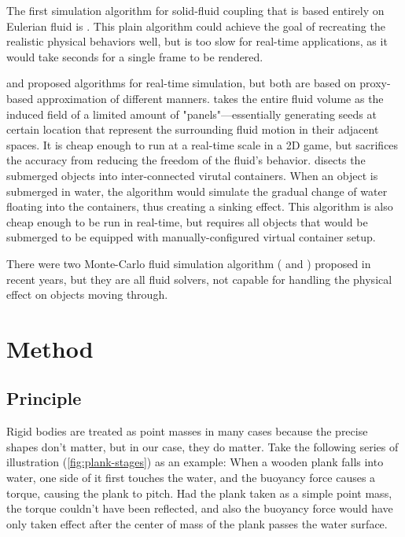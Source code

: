 \documentclass{article}
\begin{document}
The first simulation algorithm for solid-fluid coupling that is based entirely on Eulerian fluid is \cite{teng2016eulerian}.
This plain algorithm could achieve the goal of recreating the realistic physical behaviors well, but is too slow for real-time applications, as it would take seconds for a single frame to be rendered.

\cite{GER13} and \cite{BAJ20} proposed algorithms for real-time simulation, but both are based on proxy-based approximation of different manners.
\cite{GER13} takes the entire fluid volume as the induced field of a
limited amount of "panels"---essentially generating seeds at certain location that represent the surrounding fluid motion in their adjacent spaces.
It is cheap enough to run at a real-time scale in a 2D game, but sacrifices the accuracy from reducing the freedom of the fluid’s behavior.
\cite{BAJ20} disects the submerged objects into inter-connected virutal containers.
When an object is submerged in water, the algorithm would simulate the gradual change of water floating into the containers, thus creating a sinking effect.
This algorithm is also cheap enough to be run in real-time, but requires all objects that would be submerged to be equipped with manually-configured virtual container setup.

There were two Monte-Carlo fluid simulation algorithm (\cite{sugimoto2024velocity} and \cite{rioux2022monte}) proposed in recent years, but they are all fluid solvers, not capable for handling the physical effect on objects moving through.

\section{Method}

\subsection*{Principle}

Rigid bodies are treated as point masses in many cases because the precise shapes don't matter, but in our case, they do matter.
Take the following series of illustration (\ref{fig:plank-stages}) as an example:
When a wooden plank falls into water, one side of it first touches the water, and the buoyancy force causes a torque, causing the plank to pitch.
Had the plank taken as a simple point mass, the torque couldn't have been reflected, and also the buoyancy force would have only taken effect after the center of mass of the plank passes the water surface.
\end{document}
